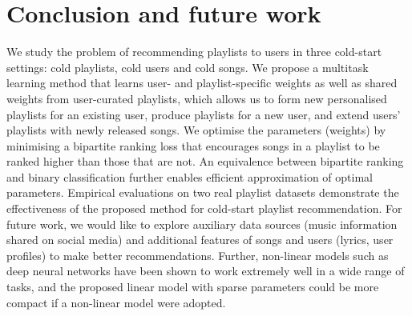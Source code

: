 \section{Conclusion and future work}

We study the problem of recommending playlists to users in three cold-start settings:
cold playlists, cold users and cold songs.
We propose a multitask learning method that learns user- and playlist-specific weights 
as well as shared weights from user-curated playlists,
which allows us to form new personalised playlists for an existing user, %
produce playlists for a new user, %
and extend users' playlists with newly released songs. %
We optimise the parameters (\ie weights) %
by minimising a bipartite ranking loss
that encourages songs in a playlist to be ranked higher than those that are not.
An equivalence between bipartite ranking and binary classification further enables efficient 
approximation of optimal parameters.
Empirical evaluations on two real playlist datasets demonstrate the effectiveness of the proposed method 
for cold-start playlist recommendation.
%
%
For future work, we would like to explore 
auxiliary data sources (\eg music information shared on social media) and additional features of songs and users 
(\eg lyrics, user profiles) %
to make better recommendations.
Further, non-linear models such as deep neural networks have been shown to work extremely well in a wide range of tasks,
and the proposed linear model with sparse parameters %
could be more compact if a non-linear model %
were adopted.

